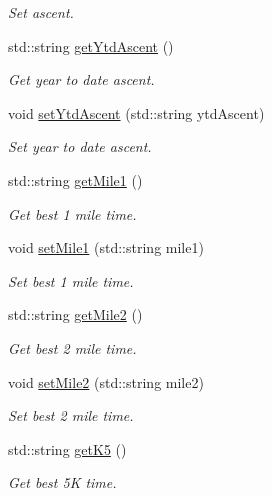 \begin{DoxyCompactItemize}
\begin{DoxyCompactList}\small\item\em Set ascent. \end{DoxyCompactList}\item 
std\+::string \mbox{\hyperlink{classAthleteDataContainer_a44c5e68a3fc070fc351539d96e43d118}{get\+Ytd\+Ascent}} ()
\begin{DoxyCompactList}\small\item\em Get year to date ascent. \end{DoxyCompactList}\item 
void \mbox{\hyperlink{classAthleteDataContainer_a8c599993fe3f754a9bcb4e15fc8eb4eb}{set\+Ytd\+Ascent}} (std\+::string ytd\+Ascent)
\begin{DoxyCompactList}\small\item\em Set year to date ascent. \end{DoxyCompactList}\item 
std\+::string \mbox{\hyperlink{classAthleteDataContainer_a0604aa7dad1956552ed2571e1188ba12}{get\+Mile1}} ()
\begin{DoxyCompactList}\small\item\em Get best 1 mile time. \end{DoxyCompactList}\item 
void \mbox{\hyperlink{classAthleteDataContainer_a30b1252a22911e82aa08cfef505b0952}{set\+Mile1}} (std\+::string mile1)
\begin{DoxyCompactList}\small\item\em Set best 1 mile time. \end{DoxyCompactList}\item 
std\+::string \mbox{\hyperlink{classAthleteDataContainer_abcf699931e5bc100542e3272da41a61d}{get\+Mile2}} ()
\begin{DoxyCompactList}\small\item\em Get best 2 mile time. \end{DoxyCompactList}\item 
void \mbox{\hyperlink{classAthleteDataContainer_ae3b4c644fb9cfeb806ecb4cdda7f6e9d}{set\+Mile2}} (std\+::string mile2)
\begin{DoxyCompactList}\small\item\em Set best 2 mile time. \end{DoxyCompactList}\item 
std\+::string \mbox{\hyperlink{classAthleteDataContainer_a83c280c3f11eb819fe996fce9b36e52e}{get\+K5}} ()
\begin{DoxyCompactList}\small\item\em Get best 5K time. \end{DoxyCompactList}\item 

\end{DoxyCompactItemize}
